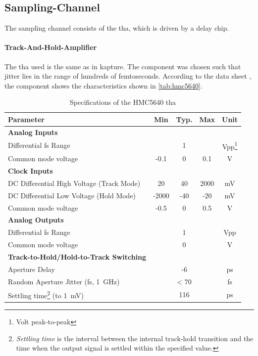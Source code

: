 \subsection{Sampling-Channel}
The sampling channel consists of the \gls{tha}, which is driven by a delay chip. 

\paragraph{Track-And-Hold-Amplifier}
The \gls{tha} used is the same as in \gls{kapture}. The component was chosen such that jitter lies in the range of hundreds of femtoseconds. \cite{caselle2013}
According to the data sheet \cite{hmc5640}, the component shows the characteristics shown in \autoref{tab:hmc5640}.
\begin{table}[tbh]
	\caption[HMC5640 Characteristics]{Specifications of the HMC5640 \gls{tha}}
	\label{tab:hmc5640}
	\begin{minipage}{\textwidth}
		\centering
		\begin{tabularx}{\textwidth}{Xcccc}
			\toprule
			\textbf{Parameter} & \textbf{Min} & \textbf{Typ.} & \textbf{Max} & \textbf{Unit}\\
			\midrule
			\textbf{Analog Inputs} &&&& \\
			Differential \gls{fs} Range & & 1 & & Vpp\footnote{Volt peak-to-peak}\\
			Common mode voltage & -0.1 & 0 & 0.1 & V\\[0.3cm]
			\textbf{Clock Inputs} &&&&\\
			DC Differential High Voltage (Track Mode) & 20 & 40 & 2000 & mV\\
			DC Differential Low Voltage (Hold Mode) & -2000 & -40 & -20 & mV\\
			Common mode voltage & -0.5 & 0 & 0.5 & V\\[0.3cm]
			\textbf{Analog Outputs} &&&&\\
			Differential \gls{fs} Range &  & 1 && Vpp\\
			Common mode voltage & & 0 & & V\\[0.3cm]
			\textbf{Track-to-Hold/Hold-to-Track Switching} &&&&\\
			Aperture Delay & & -6 &  & ps\\
			Random Aperture Jitter (\gls{fs}, \SI{1}{\giga \hertz}) & & < 70 & & fs\\
			Settling time\footnote{\textit{Settling time} is the interval between the internal track-hold transition and the time when the output signal is settled within the specified value.} (to \SI{1}{\milli \volt}) &	&  116 & & ps \\
			\bottomrule
		\end{tabularx}
	\end{minipage}
\end{table}

